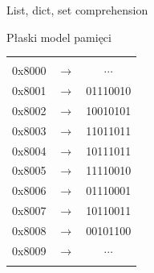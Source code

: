 \begin{frame}{List, dict, set comprehension}
    
\end{frame}

\begin{frame}{Płaski model pamięci}
    \begin{table}
        \centering
        \begin{tabular}{rc|c|}
            \cline{3-3}
            & & \\
            \cline{3-3}
            0x8000 & $\longrightarrow$ & $\cdots$ \\
            \cline{3-3}
            0x8001 & $\longrightarrow$ & 01110010 \\
            \cline{3-3}
            0x8002 & $\longrightarrow$ & 10010101 \\
            \cline{3-3}
            0x8003 & $\longrightarrow$ & 11011011 \\
            \cline{3-3}
            0x8004 & $\longrightarrow$ & 10111011 \\
            \cline{3-3}
            0x8005 & $\longrightarrow$ & 11110010 \\
            \cline{3-3}
            0x8006 & $\longrightarrow$ & 01110001 \\
            \cline{3-3}
            0x8007 & $\longrightarrow$ & 10110011 \\
            \cline{3-3}
            0x8008 & $\longrightarrow$ & 00101100 \\
            \cline{3-3}
            0x8009 & $\longrightarrow$ & $\cdots$ \\
            \cline{3-3}
            & & \\
            \cline{3-3}
        \end{tabular}
    \end{table}
\end{frame}

